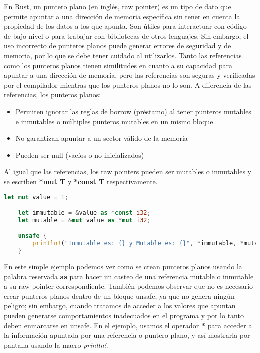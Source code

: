 En Rust, un puntero plano (en inglés, raw pointer) es un tipo de dato que permite apuntar a una dirección de memoria específica sin tener en cuenta la propiedad de los datos a los que apunta.   Son útiles para interactuar con código de bajo nivel o para trabajar con bibliotecas de otros lenguajes. Sin embargo, el uso incorrecto de punteros planos puede generar errores de seguridad y de memoria, por lo que se debe tener cuidado al utilizarlos. 
Tanto las referencias como los punteros planos tienen similitudes en cuanto a su capacidad para apuntar a una dirección de memoria, pero las referencias son seguras y verificadas por el compilador mientras que los punteros planos no lo son.
A diferencia de las referencias, los punteros planos:
\begin{itemize}
    \item Permiten ignorar las reglas de borrow (préstamo) al tener punteros mutables e inmutables o múltiples punteros mutables en un mismo bloque.
    \item No garantizan apuntar a un sector válido de la memoria
    \item Pueden ser null (vacíos o no inicializados)
\end{itemize}

Al igual que las referencias, los raw pointers pueden ser mutables o inmutables y se escriben \textbf{*mut T} y \textbf{*const T} respectivamente.
\begin{lstlisting}[language=Rust]
    let mut value = 1;

    let immutable = &value as *const i32;
    let mutable = &mut value as *mut i32;

    unsafe {
        println!("Inmutable es: {} y Mutable es: {}", *immutable, *mutable);
    }
\end{lstlisting}

En este simple ejemplo podemos ver como se crean punteros planos usando la palabra reservada \textbf{as} para hacer un casteo de una referencia mutable o inmutable a su raw pointer correspondiente. También podemos observar que no es necesario crear punteros planos dentro de un bloque unsafe, ya que no genera ningún peligro; sin embargo, cuando tratamos de acceder a los valores que apuntan pueden generarse comportamientos inadecuados en el programa y por lo tanto deben enmarcarse en unsafe. En el ejemplo, usamos el operador \textbf{*} para acceder a la información apuntada por una referencia o puntero plano, y así mostrarla por pantalla usando la macro \textit{println!}.

